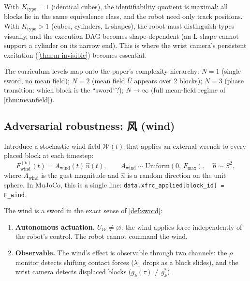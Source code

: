 \begin{remark}
\label{rem:m-types-observer}
With $K_\mathrm{type} = 1$ (identical cubes), the identifiability
quotient is maximal: all blocks lie in the same equivalence class,
and the robot need only track positions.  With
$K_\mathrm{type} > 1$ (cubes, cylinders, L-shapes), the robot
must distinguish types visually, and the execution DAG becomes
shape-dependent (an L-shape cannot support a cylinder on its
narrow end).  This is where the wrist camera's persistent
excitation (\cref{thm:m-invisible}) becomes essential.
\end{remark}

\begin{remark}
\label{rem:m-curriculum-meanfield}
The curriculum levels map onto the paper's complexity hierarchy:
$N = 1$ (single sword, no mean field); $N = 2$ (mean field
$\bar{U}$ appears over 2 blocks); $N = 3$ (phase transition:
which block is the ``sword''?); $N \to \infty$ (full mean-field
regime of \cref{thm:meanfield}).
\end{remark}

\subsection{Adversarial robustness: 风 (wind)}

Introduce a stochastic wind field $\mathcal{W}(t)$ that applies
an external wrench to every placed block at each timestep:
\[
  F_{\mathrm{wind}}^{(k)}(t)
  = A_{\mathrm{wind}}(t)\, \hat{n}(t),
  \qquad
  A_{\mathrm{wind}} \sim
  \mathrm{Uniform}(0,\, F_{\max}),
  \quad
  \hat{n} \sim S^2,
\]
where $A_{\mathrm{wind}}$ is the gust magnitude and $\hat{n}$
is a random direction on the unit sphere.  In MuJoCo, this is a
single line: \texttt{data.xfrc\_applied[block\_id] = F\_wind}.

The wind is a sword in the exact sense of \cref{def:sword}:
\begin{enumerate}[label=(\roman*),nosep]
  \item \textbf{Autonomous actuation.}  $U_{\mathcal{W}} \neq
  \varnothing$: the wind applies force independently of the
  robot's control.  The robot cannot command the wind.
  \item \textbf{Observable.}  The wind's effect is observable
  through two channels: the $\rho$ monitor detects shifting
  contact forces ($\lambda_1$ drops as a block slides), and
  the wrist camera detects displaced blocks
  ($g_k(\tau) \neq g_k^*$).
\end{enumerate}

